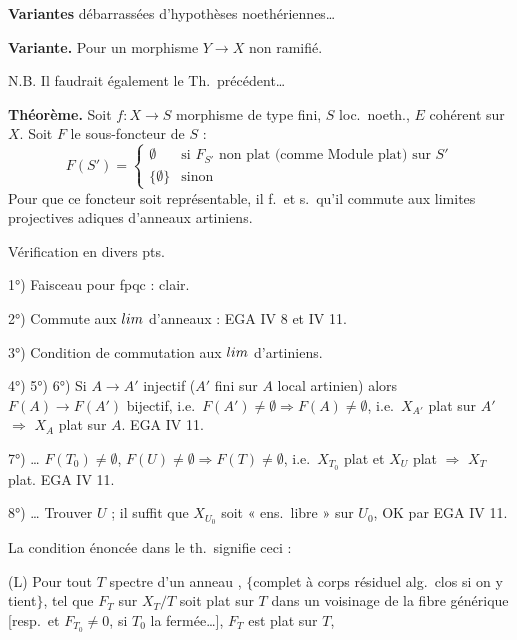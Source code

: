 \documentclass[11pt,a4paper]{article}
\begin{document}
\textbf{Variantes} débarrassées d'hypothèses noethériennes\ldots

\textbf{Variante.} Pour un morphisme $Y\to X$ non ramifié.

N.B. Il faudrait également \emph{} le Th.\ précédent\ldots

\textbf{Théorème.} Soit $f\colon X\to S$ morphisme de type fini, $S$ loc.\ noeth., $E$ cohérent sur $X$. Soit $F$ le sous-foncteur de $S$ :
\[
F(S')=\begin{cases}\emptyset & \text{si } F_{S'} \text{ non plat (comme Module plat) sur } S'\\ \{\emptyset\} & \text{sinon}\end{cases}
\]
 Pour que ce foncteur soit représentable, il f.\ et s.\ qu'il commute aux limites projectives adiques d'anneaux artiniens.

Vérification en divers pts.

1°) Faisceau pour fpqc : clair.

2°) Commute aux $\varinjlim$ d'anneaux : EGA IV 8 et IV 11.


3°) Condition de commutation aux $\varprojlim$ d'artiniens.

4°) 5°) 6°) Si $A\to A'$ injectif ($A'$ fini sur $A$ local artinien) alors $F(A)\to F(A')$ bijectif, i.e.\ $F(A')\neq\emptyset\Rightarrow F(A)\neq\emptyset$, i.e.\ $X_{A'}$ plat  sur $A'$ $\Rightarrow$ $X_A$ plat  sur $A$. EGA IV 11.

7°) \ldots{} $F(T_0)\neq\emptyset$, $F(U)\neq\emptyset \Rightarrow F(T)\neq\emptyset$, i.e.\ $X_{T_0}$ plat et $X_U$ plat $\Rightarrow$ $X_T$ plat. EGA IV 11.


8°) \ldots{} Trouver $U$ ; il suffit  que $X_{U_0}$ soit « ens.\ libre » sur $U_0$, OK par EGA IV 11.

La condition énoncée dans le th.\ signifie ceci :

(L) Pour tout $T$ spectre d'un anneau  , $\{$complet à corps résiduel alg.\ clos si on y tient$\}$,  tel que $F_T$ sur $X_T/T$ soit plat sur $T$ dans un voisinage de la fibre générique [resp.\ et $F_{T_0}\neq 0$, si $T_0$ la  fermée\ldots],  $F_T$ est plat sur $T$, 
\end{document}
